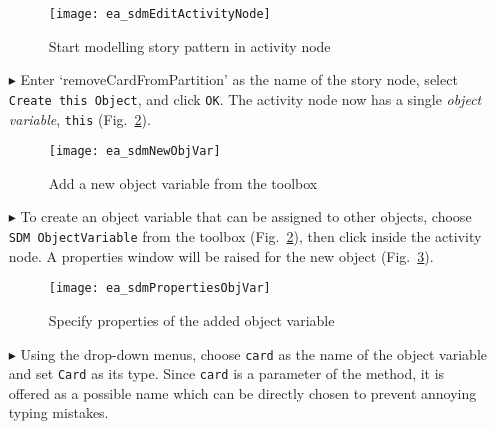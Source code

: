 \begin{itemize}
\begin{figure}[htpb]
\begin{center} 
  \texttt{[image: ea\_sdmEditActivityNode]}
  \caption{Start modelling story pattern in activity node}  
  \label{fig:story_pattern}
\end{center}
\end{figure}

\vspace{0.5cm}

\item[$\blacktriangleright$] Enter `removeCardFromPartition' as the name of the story node, select \texttt{Create this Object}, and click \texttt{OK}. The
activity node now has a single \emph{object variable}, \texttt{this} (Fig.~\ref{fig:tool_box}).

\begin{figure}[htp]
\begin{center}
  \texttt{[image: ea\_sdmNewObjVar]}
  \caption{Add a new object variable from the toolbox}  
  \label{fig:tool_box}
\end{center}
\end{figure}

\newpage

\item[$\blacktriangleright$] To create an object variable that can be assigned to other objects, choose \texttt{SDM ObjectVariable} from the toolbox
(Fig.~\ref{fig:tool_box}), then click inside the activity node. A properties window will be raised for the new object
(Fig.~\ref{fig:object_variable_properties}).

\vspace{0.5cm}

\begin{figure}[htp]
\begin{center}
  \texttt{[image: ea\_sdmPropertiesObjVar]}
  \caption{Specify properties of the added object variable}  
  \label{fig:object_variable_properties}
\end{center}
\end{figure}


\item[$\blacktriangleright$] Using the drop-down menus, choose \texttt{card} as the name of the object variable and set \texttt{Card} as its type.
Since \texttt{card} is a parameter of the method, it is offered as a possible name which can be directly chosen to prevent annoying typing mistakes.

\vspace{0.5cm}


\end{itemize}
